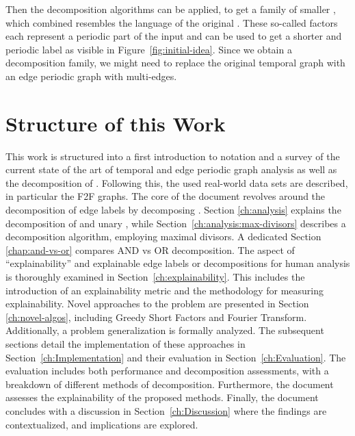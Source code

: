 Then the \DFA decomposition algorithms can be applied, to get a family of smaller \DFAs, which combined resembles the language of the original \DFA.
These so-called factors each represent a periodic part of the input and can be used to get a shorter and periodic label as visible in Figure~\ref{fig:initial-idea}.
Since we obtain a decomposition family, we might need to replace the original temporal graph with an edge periodic graph with multi-edges. 

\section{Structure of this Work}
\label{ch:Intoduction:sec:Structure}
This work is structured into a first introduction to notation and a survey of the current state of the art of temporal and edge periodic graph analysis as well as the decomposition of \DFAs.
Following this, the used real-world data sets are described, in particular the F2F graphs.
The core of the document revolves around the decomposition of edge labels by decomposing \DFAs.
Section \ref{ch:analysis} explains the decomposition of \DFAs and unary \DFAs, while Section~\ref{ch:analysis:max-divisors} describes a \LogSpace decomposition algorithm, employing maximal divisors.
A dedicated Section \ref{chap:and-vs-or} compares AND vs OR decomposition.
The aspect of \enquote{explainability} and explainable edge labels or decompositions for human analysis is thoroughly examined in Section~\ref{ch:explainability}.
This includes the introduction of an explainability metric and the methodology for measuring explainability.
Novel approaches to the problem are presented in Section \ref{ch:novel-algos}, including Greedy Short Factors and Fourier Transform.
Additionally, a problem generalization is formally analyzed.
The subsequent sections detail the implementation of these approaches in Section~\ref{ch:Implementation} and their evaluation in Section~\ref{ch:Evaluation}.
The evaluation includes both performance and decomposition assessments, with a breakdown of different methods of decomposition.
Furthermore, the document assesses the explainability of the proposed methods.
Finally, the document concludes with a discussion in Section~\ref{ch:Discussion} where the findings are contextualized, and implications are explored.






